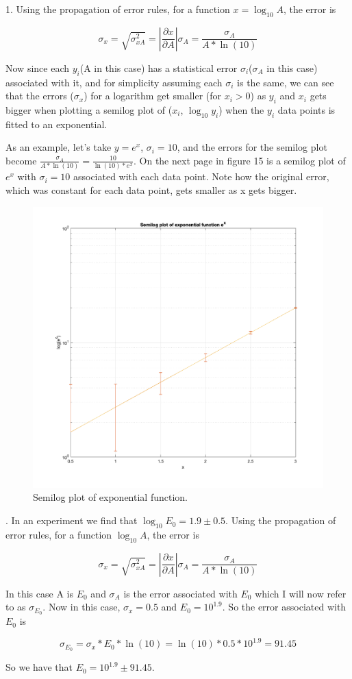 \documentclass{article}
\begin{document}
1. Using the propagation of error rules, for a function $x=\log_{10}A$, the error is 

 \[ \sigma_x=\sqrt{\sigma_{xA}^2}=|\frac{\partial x} {\partial A}|\sigma_{A}=\frac{\sigma_{A}}{A*\ln(10)}\]
 
 Now since each $y_i$(A in this case) has a statistical error $\sigma_i$($\sigma_A$ in this case) associated with it, and for simplicity assuming each $\sigma_i$ is the same, we can see that the errors ($\sigma_x$) for a logarithm get smaller (for $x_i>0$) as $y_i$ and $x_i$ gets bigger when plotting a semilog plot of ($x_i$,  $\log_{10}y_i$) when the $y_i$ data points is fitted to an exponential. 
 
 As an example, let's take $y=e^x$, $\sigma_i=10$, and the errors for the semilog plot become $\frac{\sigma_{A}}{A*\ln(10)}=\frac{10}{\ln(10)*e^x}$. On the next page in figure 15 is a semilog plot of $e^x$ with $\sigma_i=10$ associated with each data point. Note how the original error, which was constant for each data point, gets smaller as x gets bigger.
 
 \begin{figure}[H]
  \centering
  \includegraphics[width=0.8\linewidth]{lateximages/Prob7_1.png}
  \caption{Semilog plot of exponential function.}
  \label{fig:boat2}
  \end{figure}  
 
 . In an experiment we find that $\log_{10}E_0=1.9\pm0.5$. Using the propagation of error rules, for a function $\log_{10}A$, the error is 

 \[ \sigma_x=\sqrt{\sigma_{xA}^2}=|\frac{\partial x} {\partial A}|\sigma_{A}=\frac{\sigma_{A}}{A*\ln(10)}\]
 
 \noindent In this case A is $E_0$ and $\sigma_A$ is the error associated with $E_0$ which I will now refer to as $\sigma_{E_0}$. Now in this case, $\sigma_x=0.5$ and $E_0=10^{1.9}$. So the error associated with $E_0$ is 
 
\[ \sigma_{E_0}=\sigma_{x}*E_0*\ln(10)=\ln(10)*0.5*10^{1.9}=\boxed{91.45}\]

\noindent So we have that $E_0=10^{1.9}\pm91.45$. 

 
 
 
\end{document}
